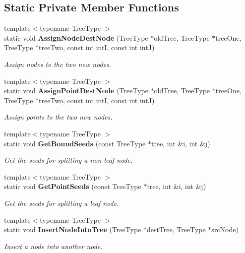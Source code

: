 \subsection*{Static Private Member Functions}
\begin{DoxyCompactItemize}
\item 
{\footnotesize template$<$typename Tree\+Type $>$ }\\static void {\bf Assign\+Node\+Dest\+Node} (Tree\+Type $\ast$old\+Tree, Tree\+Type $\ast$tree\+One, Tree\+Type $\ast$tree\+Two, const int intI, const int intJ)
\begin{DoxyCompactList}\small\item\em Assign nodes to the two new nodes. \end{DoxyCompactList}\item 
{\footnotesize template$<$typename Tree\+Type $>$ }\\static void {\bf Assign\+Point\+Dest\+Node} (Tree\+Type $\ast$old\+Tree, Tree\+Type $\ast$tree\+One, Tree\+Type $\ast$tree\+Two, const int intI, const int intJ)
\begin{DoxyCompactList}\small\item\em Assign points to the two new nodes. \end{DoxyCompactList}\item 
{\footnotesize template$<$typename Tree\+Type $>$ }\\static void {\bf Get\+Bound\+Seeds} (const Tree\+Type $\ast$tree, int \&i, int \&j)
\begin{DoxyCompactList}\small\item\em Get the seeds for splitting a non-\/leaf node. \end{DoxyCompactList}\item 
{\footnotesize template$<$typename Tree\+Type $>$ }\\static void {\bf Get\+Point\+Seeds} (const Tree\+Type $\ast$tree, int \&i, int \&j)
\begin{DoxyCompactList}\small\item\em Get the seeds for splitting a leaf node. \end{DoxyCompactList}\item 
{\footnotesize template$<$typename Tree\+Type $>$ }\\static void {\bf Insert\+Node\+Into\+Tree} (Tree\+Type $\ast$dest\+Tree, Tree\+Type $\ast$src\+Node)
\begin{DoxyCompactList}\small\item\em Insert a node into another node. \end{DoxyCompactList}\end{DoxyCompactItemize}


